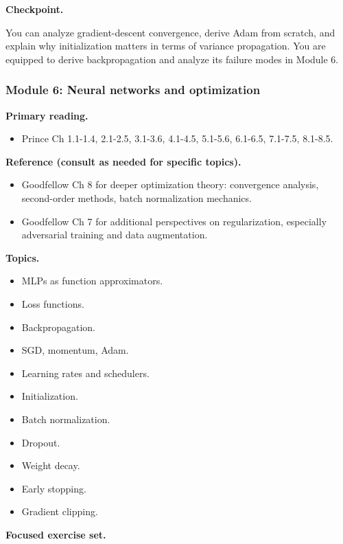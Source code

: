 \textbf{Checkpoint.}

You can analyze gradient-descent convergence, derive Adam from scratch,
and explain why initialization matters in terms of variance propagation.
You are equipped to derive backpropagation and analyze its failure modes
in Module 6.

\subsubsection{Module 6: Neural networks and
optimization}\label{module-6-neural-networks-and-optimization}

\textbf{Primary reading.}

\begin{itemize}
\tightlist
\item
  Prince Ch 1.1-1.4, 2.1-2.5, 3.1-3.6, 4.1-4.5, 5.1-5.6, 6.1-6.5,
  7.1-7.5, 8.1-8.5.
\end{itemize}

\textbf{Reference (consult as needed for specific topics).}

\begin{itemize}
\tightlist
\item
  Goodfellow Ch 8 for deeper optimization theory: convergence analysis,
  second-order methods, batch normalization mechanics.
\item
  Goodfellow Ch 7 for additional perspectives on regularization,
  especially adversarial training and data augmentation.
\end{itemize}

\textbf{Topics.}

\begin{itemize}
\tightlist
\item
  MLPs as function approximators.
\item
  Loss functions.
\item
  Backpropagation.
\item
  SGD, momentum, Adam.
\item
  Learning rates and schedulers.
\item
  Initialization.
\item
  Batch normalization.
\item
  Dropout.
\item
  Weight decay.
\item
  Early stopping.
\item
  Gradient clipping.
\end{itemize}

\textbf{Focused exercise set.}


